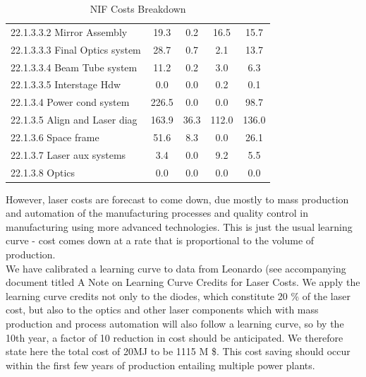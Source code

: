 \begin{table}[h!]
{\begin{tabular}{lcccc}
\hspace{10mm}22.1.3.3.2 Mirror Assembly & 19.3 & 0.2 & 16.5 & 15.7 \\
\hspace{10mm}22.1.3.3.3 Final Optics system & 28.7 & 0.7 & 2.1 & 13.7 \\
\hspace{10mm}22.1.3.3.4 Beam Tube system & 11.2 & 0.2 & 3.0 & 6.3 \\
\hspace{10mm}22.1.3.3.5 Interstage Hdw & 0.0 & 0.0 & 0.2 & 0.1 \\
\hspace{5mm}22.1.3.4 Power cond system & 226.5 & 0.0 & 0.0 & 98.7 \\
\hspace{5mm}22.1.3.5 Align and Laser diag & 163.9 & 36.3 & 112.0 & 136.0 \\
\hspace{5mm}22.1.3.6 Space frame & 51.6 & 8.3 & 0.0 & 26.1 \\
\hspace{5mm}22.1.3.7 Laser aux systems & 3.4 & 0.0 & 9.2 & 5.5 \\
\hspace{5mm}22.1.3.8 Optics & 0.0 & 0.0 & 0.0 & 0.0 \\
\hline
\end{tabular}}
\caption{NIF Costs Breakdown}
\label{tab:nif_costs}
\end{table}

 However, laser costs are forecast to come down, due mostly to mass production and automation of the manufacturing processes and  
 quality control in manufacturing using more advanced technologies.   
 This is just the usual learning curve - cost comes down at a rate that is proportional to the volume of production.  \\ 

 We have calibrated a learning curve to data from Leonardo (see accompanying document titled A Note on Learning Curve Credits for Laser Costs. 
 We apply the learning curve credits not only to the diodes, which constitute 20 \% of the laser cost, but also to the  
 optics and other laser components which with mass production and process automation will also follow a learning curve, so  
 by the 10th year, a factor of 10 reduction in cost should be anticipated.  We therefore state here the total cost of 20MJ  
 to be 1115 M \$.  This cost saving should occur within the first few years of production entailing multiple power plants. \\

